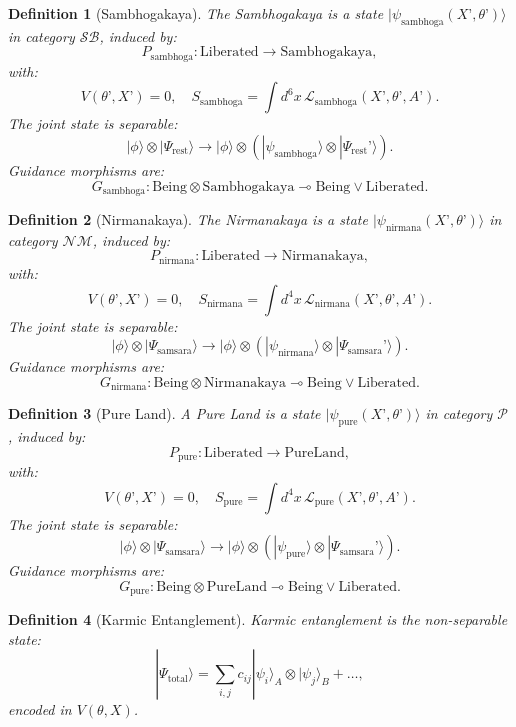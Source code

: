 \documentclass{article}
\newtheorem{definition}{Definition}
\begin{document}
\begin{definition}[Sambhogakaya]
\label{def:sambhogakaya}
The Sambhogakaya is a state \( |\psi_{\text{sambhoga}}(X’, \theta’)\rangle \) in category \( \mathcal{SB} \), induced by:
\[
P_{\text{sambhoga}} : \text{Liberated} \to \text{Sambhogakaya},
\]
with:
\[
V(\theta’, X’) = 0, \quad S_{\text{sambhoga}} = \int d^6x \, \mathcal{L}_{\text{sambhoga}}(X’, \theta’, A’).
\]
The joint state is separable:
\[
|\phi\rangle \otimes |\Psi_{\text{rest}}\rangle \to |\phi\rangle \otimes (|\psi_{\text{sambhoga}}\rangle \otimes |\Psi_{\text{rest}}’\rangle).
\]
Guidance morphisms are:
\[
G_{\text{sambhoga}} : \text{Being} \otimes \text{Sambhogakaya} \multimap \text{Being} \lor \text{Liberated}.
\]
\end{definition}

\begin{definition}[Nirmanakaya]
\label{def:nirmanakaya}
The Nirmanakaya is a state \( |\psi_{\text{nirmana}}(X’, \theta’)\rangle \) in category \( \mathcal{NM} \), induced by:
\[
P_{\text{nirmana}} : \text{Liberated} \to \text{Nirmanakaya},
\]
with:
\[
V(\theta’, X’) = 0, \quad S_{\text{nirmana}} = \int d^4x \, \mathcal{L}_{\text{nirmana}}(X’, \theta’, A’).
\]
The joint state is separable:
\[
|\phi\rangle \otimes |\Psi_{\text{samsara}}\rangle \to |\phi\rangle \otimes (|\psi_{\text{nirmana}}\rangle \otimes |\Psi_{\text{samsara}}’\rangle).
\]
Guidance morphisms are:
\[
G_{\text{nirmana}} : \text{Being} \otimes \text{Nirmanakaya} \multimap \text{Being} \lor \text{Liberated}.
\]
\end{definition}

\begin{definition}[Pure Land]
\label{def:pure-land}
A Pure Land is a state \( |\psi_{\text{pure}}(X’, \theta’)\rangle \) in category \( \mathcal{P} \), induced by:
\[
P_{\text{pure}} : \text{Liberated} \to \text{PureLand},
\]
with:
\[
V(\theta’, X’) = 0, \quad S_{\text{pure}} = \int d^4x \, \mathcal{L}_{\text{pure}}(X’, \theta’, A’).
\]
The joint state is separable:
\[
|\phi\rangle \otimes |\Psi_{\text{samsara}}\rangle \to |\phi\rangle \otimes (|\psi_{\text{pure}}\rangle \otimes |\Psi_{\text{samsara}}’\rangle).
\]
Guidance morphisms are:
\[
G_{\text{pure}} : \text{Being} \otimes \text{PureLand} \multimap \text{Being} \lor \text{Liberated}.
\]
\end{definition}

\begin{definition}[Karmic Entanglement]
\label{def:karmic-entanglement}
Karmic entanglement is the non-separable state:
\[
|\Psi_{\text{total}}\rangle = \sum_{i,j} c_{ij} |\psi_i\rangle_A \otimes |\psi_j\rangle_B + \dots,
\]
encoded in \( V(\theta, X) \).
\end{definition}
\end{document}
